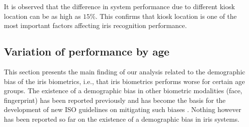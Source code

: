 \documentclass{cta-author}%
\begin{document}


It is observed that the difference in system performance due to different kiosk location can be as high as  $15\%$.
This confirms that kiosk location is one of the most important factors affecting iris recognition performance.



\subsection{Variation of performance by age}




This section presents the main finding of our analysis related to the demographic bias of the iris biometrics, i.e., that  iris biometrics performs worse for certain age groups.
The existence of a demographic bias in other biometric modalities (face, fingerprint)  has been reported previously and has become the basis for the development of new ISO guidelines on mitigating such biases \cite{ISO-bias}.  
Nothing however has been reported so far  on  the existence of a demographic bias in iris systems.  

\end{document}
